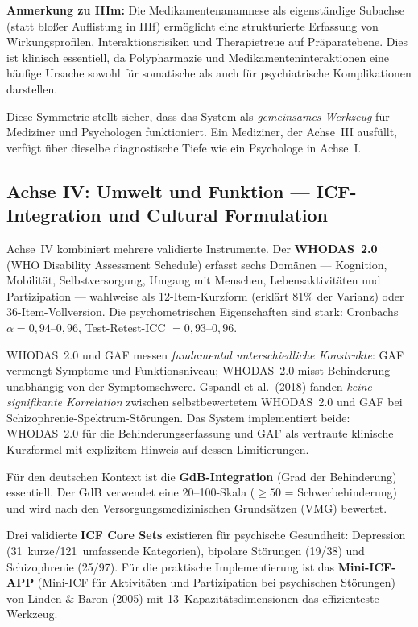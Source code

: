 \documentclass[11pt,a4paper]{article}
\begin{document}
\textbf{Anmerkung zu IIIm:} Die Medikamentenanamnese als eigenst\"andige Subachse (statt blo\ss{}er Auflistung in IIIf) erm\"oglicht eine strukturierte Erfassung von Wirkungsprofilen, Interaktionsrisiken und Therapietreue auf Pr\"aparatebene. Dies ist klinisch essentiell, da Polypharmazie und Medikamenteninteraktionen eine h\"aufige Ursache sowohl f\"ur somatische als auch f\"ur psychiatrische Komplikationen darstellen.

Diese Symmetrie stellt sicher, dass das System als \textit{gemeinsames Werkzeug} f\"ur Mediziner und Psychologen funktioniert. Ein Mediziner, der Achse~III ausf\"ullt, verf\"ugt \"uber dieselbe diagnostische Tiefe wie ein Psychologe in Achse~I.

\subsection{Achse IV: Umwelt und Funktion --- ICF-Integration und Cultural Formulation}
\label{sec:achse4}

Achse~IV kombiniert mehrere validierte Instrumente. Der \textbf{WHODAS~2.0} (WHO Disability Assessment Schedule) erfasst sechs Dom\"anen --- Kognition, Mobilit\"at, Selbstversorgung, Umgang mit Menschen, Lebensaktivit\"aten und Partizipation --- wahlweise als 12-Item-Kurzform (erkl\"art 81\% der Varianz) oder 36-Item-Vollversion. Die psychometrischen Eigenschaften sind stark: Cronbachs $\alpha = 0{,}94$--$0{,}96$, Test-Retest-ICC $= 0{,}93$--$0{,}96$.

WHODAS~2.0 und GAF messen \textit{fundamental unterschiedliche Konstrukte}: GAF vermengt Symptome und Funktionsniveau; WHODAS~2.0 misst Behinderung unabh\"angig von der Symptomschwere. Gspandl et al.\ (2018) fanden \textit{keine signifikante Korrelation} zwischen selbstbewertetem WHODAS~2.0 und GAF bei Schizophrenie-Spektrum-St\"orungen. Das System implementiert beide: WHODAS~2.0 f\"ur die Behinderungserfassung und GAF als vertraute klinische Kurzformel mit explizitem Hinweis auf dessen Limitierungen.

F\"ur den deutschen Kontext ist die \textbf{GdB-Integration} (Grad der Behinderung) essentiell. Der GdB verwendet eine 20--100-Skala ($\geq 50$ = Schwerbehinderung) und wird nach den Versorgungsmedizinischen Grunds\"atzen (VMG) bewertet.

Drei validierte \textbf{ICF Core Sets} existieren f\"ur psychische Gesundheit: Depression (31~kurze/121~umfassende Kategorien), bipolare St\"orungen (19/38) und Schizophrenie (25/97). F\"ur die praktische Implementierung ist das \textbf{Mini-ICF-APP} (Mini-ICF f\"ur Aktivit\"aten und Partizipation bei psychischen St\"orungen) von Linden \& Baron (2005) mit 13~Kapazit\"atsdimensionen das effizienteste Werkzeug.
\end{document}
